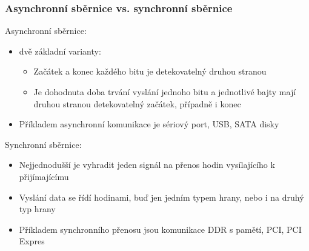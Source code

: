 \documentclass{beamer}
\begin{document}
\begin{frame}
\frametitle{Asynchronní sběrnice vs. synchronní sběrnice}

Asynchronní sběrnice:
\begin{itemize}
\item  dvě základní varianty:
\begin{itemize}
\item Začátek a konec každého bitu je detekovatelný druhou stranou
\item Je dohodnuta doba trvání vyslání jednoho bitu a jednotlivé bajty mají druhou stranou detekovatelný začátek, případně i konec
\end{itemize}
\item Příkladem asynchronní komunikace je sériový port, USB, SATA disky
\end{itemize}


Synchronní sběrnice:
\begin{itemize}
\item Nejjednodušší je vyhradit jeden signál na přenos hodin vysílajícího k přijímajícímu
\item Vyslání data se řídí hodinami, buď jen jedním typem hrany, nebo i na druhý typ hrany
\item Příkladem synchronního přenosu jsou komunikace DDR s pamětí, PCI, PCI Expres
\end{itemize}
\end{frame}
\end{document}
